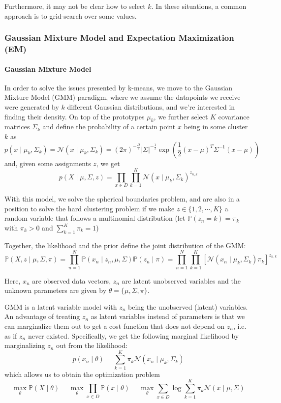\documentclass{article}
\newcommand{\prob}{\mathbb{P}}
\begin{document}
Furthermore, it may not be clear how to select $k$.
In these situations, a common approach is to grid-search over some values.

\subsubsection{Gaussian Mixture Model and Expectation Maximization (EM)}

\paragraph{Gaussian Mixture Model}

In order to solve the issues presented by k-means, we move to the Gaussian Mixture Model (GMM) paradigm, where we assume the datapoints we receive were generated by $k$ different Gaussian distributions, and we're interested in finding their density.
On top of the prototypes $\mu_k$, we further select $K$ covariance matrices $\Sigma_k$ and define the probability of a certain point $x$ being in some cluster $k$ as
$$
p(x \mid \mu_k, \Sigma_k) = \mathcal{N}(x \mid \mu_k, \Sigma_k) = (2 \pi)^{-\frac{D}{2}} |\Sigma|^{-\frac{1}{2}} \exp \left( \frac{1}{2} (x-\mu)^T \Sigma^{-1} (x-\mu) \right)
$$
and, given some assignments $z$, we get
$$
p(X \mid \mu, \Sigma, z) = \prod_{x \in D} \prod_{k=1}^K \mathcal{N}(x \mid \mu_k, \Sigma_k)^{z_{n,k}}
$$

With this model, we solve the spherical boundaries problem, and are also in a position to solve the hard clustering problem if we make $z \in \{1, 2, \cdots, K\}$ a random variable that follows a multinomial distribution (let $\prob(z_n = k) = \pi_k$ with $\pi_k > 0$ and $\sum_{k=1}^K \pi_k = 1$)

Together, the likelihood and the prior define the joint distribution of the GMM:
$$
\prob(X, z \mid \mu, \Sigma, \pi) = 
\prod_{n=1}^N \prob(x_n \mid z_n, \mu, \Sigma) \prob(z_n \mid \pi) = 
\prod_{n=1}^N \prod_{k=1}^K \left[ \mathcal{N}(x_n \mid \mu_k, \Sigma_k) \pi_k \right]^{z_{n,k}}
$$

Here, $x_n$ are observed data vectors, $z_n$ are latent unobserved variables and the unknown parameters are given by $\theta = \{ \mu, \Sigma, \pi \}$.

GMM is a latent variable model with $z_n$ being the unobserved (latent) variables.
An advantage of treating $z_n$ as latent variables instead of parameters is that we can marginalize them out to get a cost function that does not depend on $z_n$, i.e. as if $z_n$ never existed.
Specifically, we get the following marginal likelihood by marginalizing $z_n$ out from the likelihood:
$$
p(x_n \mid \theta) = \sum_{k=1}^K \pi_k \mathcal{N}(x_n \mid \mu_k, \Sigma_k)
$$
which allows us to obtain the optimization problem
$$
\max_\theta \prob(X \mid \theta) =
\max_\theta \prod_{x \in D} \prob(x \mid \theta) = 
\max_\theta \sum_{x \in D} \log \sum_{k=1}^K \pi_k \mathcal{N}(x \mid \mu, \Sigma)
$$
\end{document}

